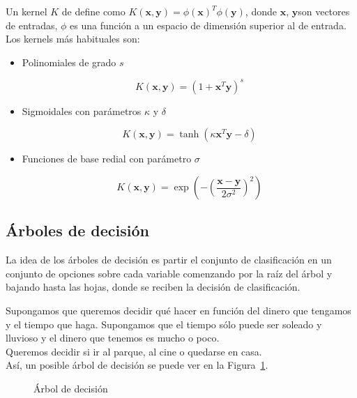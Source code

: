 Un kernel $K$ de define como $K(\mathbf{x}, \mathbf{y}) = \phi(\mathbf{x})^T \phi(\mathbf{y})$, donde $\mathbf{x}$, $\mathbf{y}$son vectores de entradas, $\phi$ es una función a un espacio de dimensión superior al de entrada.\\

Los kernels más habituales son:

\begin{itemize}
	\item Polinomiales de grado $s$
	
	\begin{equation}
	K(\mathbf{x},\mathbf{y}) = (1 + \mathbf{x}^T \mathbf{y})^s
	\end{equation}
	
	\item Sigmoidales con parámetros $\kappa$ y $\delta$
	
	\begin{equation}
	K(\mathbf{x}, \mathbf{y}) = \tanh(\kappa \mathbf{x}^T\mathbf{y} - \delta)
	\end{equation}
	
	\item Funciones de base redial con parámetro $\sigma$
	
	\begin{equation}
	K(\mathbf{x}, \mathbf{y}) = \exp\left(-\left(\dfrac{\mathbf{x} - \mathbf{y}}{2\sigma^2}\right)^2\right)
	\end{equation}
\end{itemize}

\subsection{Árboles de decisión}

La idea de los árboles de decisión es partir el conjunto de clasificación en un conjunto de opciones sobre cada variable comenzando por la raíz del árbol y bajando hasta las hojas, donde se reciben la decisión de clasificación. \\

\begin{ejemplo}
Supongamos que queremos decidir qué hacer en función del dinero que tengamos y el tiempo que haga. Supongamos que el tiempo sólo puede ser soleado y lluvioso y el dinero que tenemos es mucho o poco.\\

Queremos decidir si ir al parque, al cine o quedarse en casa.\\

Así, un posible árbol de decisión se puede ver en la Figura~\ref{fig:arboldecision}.

\begin{figure}[htbp!]
	\label{fig:arboldecision}
	\begin{center}
		\arboldedecision
	\end{center}
	\caption{Árbol de decisión}
\end{figure}
\end{ejemplo}

